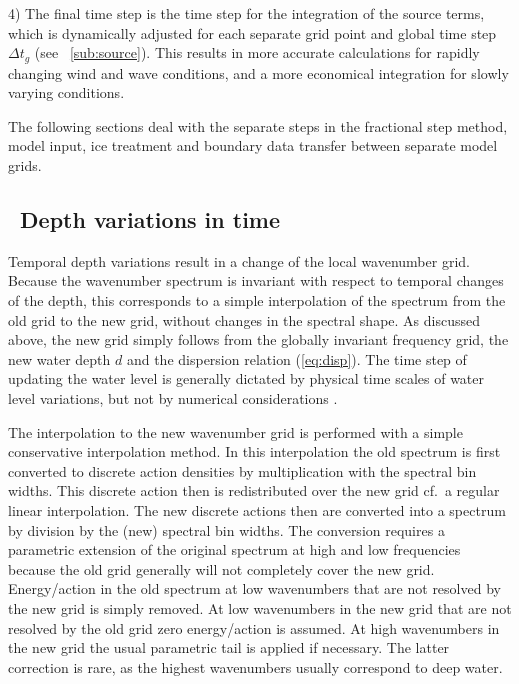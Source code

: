 \begin{list}{xx}{\itemsep 0mm \parsep 0mm \rightmargin 5mm}
\item[4)] The final time step is the time step for the integration of the
source terms, which is dynamically adjusted for each separate grid point and
global time step $\Delta t_g$ (see \para~\ref{sub:source}). This results in
more accurate calculations for rapidly changing wind and wave conditions, and
a more economical integration for slowly varying conditions.

\end{list}

\vspace{\baselineskip} \noindent The following sections deal with the separate
steps in the fractional step method, model input, ice treatment and boundary
data transfer between separate model grids.


\vssub
\subsection{~Depth variations in time}
\vssub

Temporal depth variations result in a change of the local wavenumber
grid. Because the wavenumber spectrum is invariant with respect to temporal
changes of the depth, this corresponds to a simple interpolation of the
spectrum from the old grid to the new grid, without changes in the spectral
shape. As discussed above, the new grid simply follows from the globally
invariant frequency grid, the new water depth $d$ and the dispersion relation
(\ref{eq:disp}). The time step of updating the water level is generally
dictated by physical time scales of water level variations, but not by
numerical considerations \citep{tol:GAOS98b}.

The interpolation to the new wavenumber grid is performed with a simple
conservative interpolation method. In this interpolation the old spectrum is
first converted to discrete action densities by multiplication with the
spectral bin widths. This discrete action then is redistributed over the new
grid cf.\ a regular linear interpolation. The new discrete actions then are
converted into a spectrum by division by the (new) spectral bin widths. The
conversion requires a parametric extension of the original spectrum at high
and low frequencies because the old grid generally will not completely cover
the new grid. Energy/action in the old spectrum at low wavenumbers that are
not resolved by the new grid is simply removed. At low wavenumbers in the new
grid that are not resolved by the old grid zero energy/action is assumed. At
high wavenumbers in the new grid the usual parametric tail is applied if
necessary. The latter correction is rare, as the highest wavenumbers usually
correspond to deep water.

